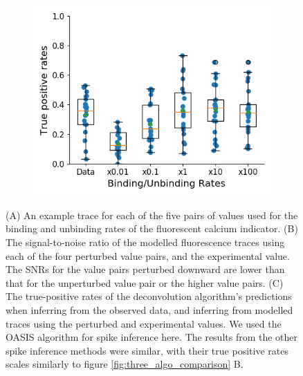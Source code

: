 \begin{figure}[p]
\begin{subfigure}{0.45\textwidth}
        \includegraphics[width=\linewidth]{figures/calcium_chapter/b_i_f_i_perturbed_oasis_tp_paper.png}
        \caption{}
        \label{fig:rates_perturbed_inference}
    \end{subfigure}
    \caption{(A) An example trace for each of the five pairs of values used for the binding and unbinding rates of the fluorescent calcium indicator. (B) The signal-to-noise ratio of the modelled fluorescence traces using each of the four perturbed value pairs, and the experimental value. The SNRs for the value pairs perturbed downward are lower than that for the unperturbed value pair or the higher value pairs. (C) The true-positive rates of the deconvolution algorithm's predictions when inferring from the observed data, and inferring from modelled traces using the perturbed and experimental values. We used the OASIS algorithm for spike inference here. The results from the other spike inference methods were similar, with their true positive rates scales similarly to figure \ref{fig:three_algo_comparison} B.}
    \label{fig:rates_perturbed}
\end{figure}

